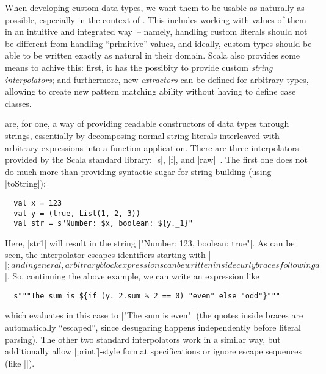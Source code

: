 When developing custom data types, we want them to be usable as naturally as possible, especially in
the context of \dsls. This includes working with values of them in an intuitive and integrated
way~-- namely, handling custom literals should not be different from handling \enquote{primitive}
values, and ideally, custom types should be able to be written exactly as natural in their
domain. Scala also provides some means to achive this: first, it has the possibity to provide custom
\emph{string interpolators}; and furthermore, new \emph{extractors} can be defined for arbitrary
types, allowing to create new pattern matching ability without having to define case classes.

 are, for one, a way of providing readable constructors of data
types through strings, essentially by decomposing normal string literals interleaved with arbitrary
expressions into a function application. There are three interpolators provided by the Scala
standard library: |s|, |f|, and |raw|~\cite{suereth:string_interpolation}. The first one does not do
much more than providing syntactic sugar for string building (using |toString|):
\begin{lstlisting}
  val x = 123
  val y = (true, List(1, 2, 3))
  val str = s"Number: $x, boolean: ${y._1}"
\end{lstlisting}
Here, |str1| will result in the string |"Number: 123, boolean: true"|. As can be seen, the
interpolator escapes identifiers starting with |$|; and in general, arbitrary block expressions can
be written inside curly braces following a |$|. So, continuing the above example, we can write an
expression like
\begin{lstlisting}
  s"""The sum is ${if (y._2.sum % 2 == 0) "even" else "odd"}"""
\end{lstlisting} %
which evaluates in this case to |"The sum is even"| (the quotes inside braces are automatically
\enquote{escaped}, since desugaring happens independently before literal parsing). The other two
standard interpolators work in a similar way, but additionally allow |printf|-style format
specifications or ignore escape sequences (like |\n|).


